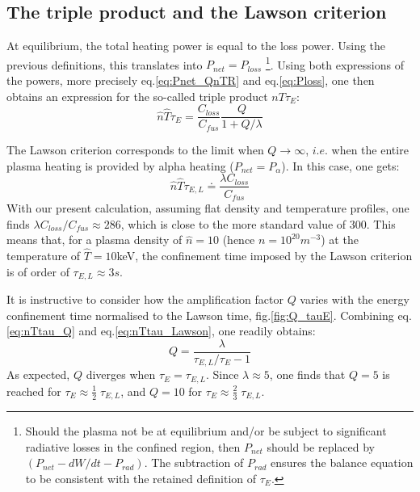 \subsection{The triple product and the Lawson criterion}
At equilibrium, the total heating power is equal to the loss power. Using the previous definitions, this translates into $P_{net} =P_{loss}$ \footnote{Should the plasma not be at equilibrium and/or be subject to significant radiative losses in the confined region, then $P_{net}$ should be replaced by $(P_{net}-dW/dt-P_{rad})$. The subtraction of $P_{rad}$ ensures the balance equation to be consistent with the retained definition of $\tau_E$.}.
Using both expressions of the powers, more precisely eq.\ref{eq:Pnet_QnTR} and eq.\ref{eq:Ploss}, one then obtains an expression for the so-called triple product $nT\tau_E$:
\begin{equation}
\boxed{
  \hat n \hat T \tau_E = \frac{C_{loss}}{C_{fus}} \frac{Q}{1+Q/\lambda} }
\label{eq:nTtau_Q}
\end{equation}

The Lawson criterion corresponds to the limit when $Q\to\infty$, $i.e.$ when the entire plasma heating is provided by alpha heating ($P_{net}=P_\alpha$). In this case, one gets:
\begin{equation}
  \hat n \hat T \tau_{E,L} \doteq \frac{\lambda C_{loss}}{C_{fus}}
\label{eq:nTtau_Lawson}
\end{equation}
With our present calculation, assuming flat density and temperature profiles, one finds $\lambda C_{loss}/C_{fus} \approx 286$, which is close to the more standard value of 300. This means that, for a plasma density of $\hat n=10$ (hence $n=10^{20}\si{m^{-3}}$) at the temperature of $\hat T=10$keV, the confinement time imposed by the Lawson criterion is of order of $\tau_{E,L} \approx 3s$.

It is instructive to consider how the amplification factor $Q$ varies with the energy confinement time normalised to the Lawson time, fig.\ref{fig:Q_tauE}. Combining eq.\ref{eq:nTtau_Q} and eq.\ref{eq:nTtau_Lawson}, one readily obtains:
\begin{equation*}
    Q = \frac{\lambda}{\tau_{E,L}/\tau_E - 1}
\end{equation*}
As expected, $Q$ diverges when $\tau_E = \tau_{E,L}$. Since $\lambda \approx 5$, one finds that $Q=5$ is reached for $\tau_E \approx \frac{1}{2}\; \tau_{E,L}$, and $Q=10$ for $\tau_E \approx \frac{2}{3}\; \tau_{E,L}$.

